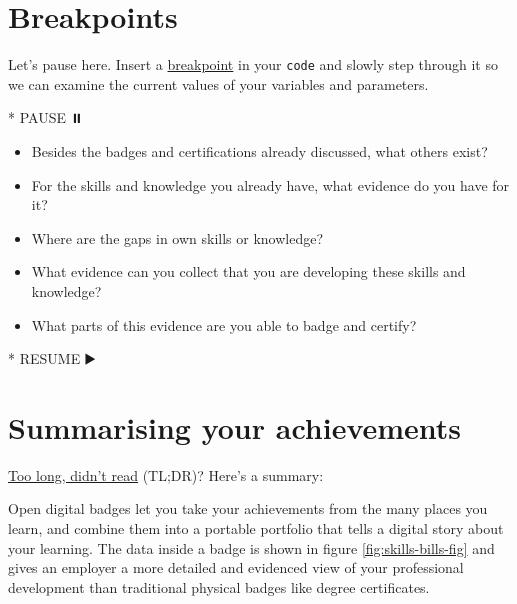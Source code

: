 \documentclass[
]{book}
\newenvironment{Shaded}{\begin{snugshade}}{\end{snugshade}}
\newcommand{\NormalTok}[1]{#1}
\newcommand{\SpecialStringTok}[1]{\textcolor[rgb]{0.31,0.60,0.02}{#1}}
\providecommand{\tightlist}{%
  \setlength{\itemsep}{0pt}\setlength{\parskip}{0pt}}
\begin{document}
\hypertarget{bpach}{%
\section{Breakpoints}\label{bpach}}

Let's pause here. Insert a \href{https://en.wikipedia.org/wiki/Breakpoint}{breakpoint} in your \texttt{code} and slowly step through it so we can examine the current values of your variables and parameters.

\begin{Shaded}
\begin{Highlighting}[]
\SpecialStringTok{* }\NormalTok{PAUSE ⏸️}
\end{Highlighting}
\end{Shaded}

\begin{itemize}
\tightlist
\item
  Besides the badges and certifications already discussed, what others exist?
\item
  For the skills and knowledge you already have, what evidence do you have for it?
\item
  Where are the gaps in own skills or knowledge?
\item
  What evidence can you collect that you are developing these skills and knowledge?
\item
  What parts of this evidence are you able to badge and certify?
\end{itemize}

\begin{Shaded}
\begin{Highlighting}[]
\SpecialStringTok{* }\NormalTok{RESUME ▶️}
\end{Highlighting}
\end{Shaded}

\hypertarget{tldrb}{%
\section{Summarising your achievements}\label{tldrb}}

\href{https://en.wiktionary.org/wiki/too_long;_didn\%27t_read}{Too long, didn't read} (TL;DR)? Here's a summary:

Open digital badges let you take your achievements from the many places you learn, and combine them into a portable portfolio that tells a digital story about your learning. The data inside a badge is shown in figure \ref{fig:skills-bills-fig} and gives an employer a more detailed and evidenced view of your professional development than traditional physical badges like degree certificates.
\end{document}
